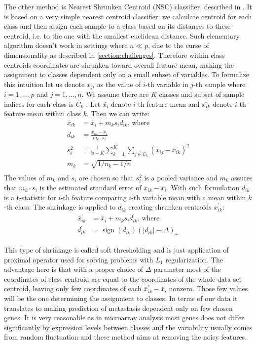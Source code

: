 \documentclass[12pt, wide]{mwart}
\begin{document}
The other method is Nearest Shrunken Centroid (NSC) classifier, described in \cite{NSC}. It is based on a very simple nearest centroid classifier: we calculate centroid for each class and then assign each sample to a class based on its distances to these centroid, i.e. to the one with the smallest euclidean distance. Such elementary algorithm doesn't work in settings where $n \ll p$, due to the curse of dimensionality as described in \ref{section:challenges}. Therefore within class centroids coordinates are shrunken toward overall feature mean, making the assignment to classes dependent only on a small subset of variables. To formalize this intuition let us denote $x_{ji}$ as the value of $i$-th variable in $j$-th sample where $i=1, \ldots, p$ and $j=1,\ldots,n$. We assume there are $K$ classes and subset of sample indices for each class is $C_k$ . Let $\bar{x_i}$ denote $i$-th feature mean and $\bar{x_{ik}}$ denote $i$-th feature mean within class $k$. Then we can write:
\begin{align*}
    \bar{x}_{i k}&=\bar{x}_{i}+m_{k} s_{i} d_{i k} \text{, where} \\
    d_{i k}&=\frac{\bar{x}_{i k}-\bar{x}_{i}}{m_{k} \cdot s_{i}} \\ 
    s_{i}^{2}&=\frac{1}{n-K} \sum_{k=1}^{K} \sum_{j \in C_{k}}\left(x_{i j}-\bar{x}_{i k}\right)^{2} \\
    m_{k}&=\sqrt{1 / n_{k}-1 / n} \\
\end{align*}
The values of $m_k$ and $s_i$ are chosen so that $s_i^2$ is a pooled variance and $m_k$ assures that $m_k \cdot s_i$ is the estimated standard error of $\bar{x}_{i k}-\bar{x}_{i}$. With such formulation $d_{ik}$ is a t-statistic for $i$-th feature comparing $i$-th variable mean with a mean within $k$-th class. The shrinkage is applied to $d_{ik}$ creating shrunken centroids $\bar{x}_{ik}^{\prime}$:
\begin{align*}
    \bar{x}_{i k}^{\prime}&=\bar{x}_{i}+m_{k} s_{i} d_{i k}^{\prime} \text{, where} \\
    d_{i k}^{\prime}&=\operatorname{sign}\left(d_{i k}\right)\left(\left|d_{i k}\right|-\Delta\right)_{+}
\end{align*}

This type of shrinkage is called soft thresholding and is just application of proximal operator used for solving problems with $L_1$ regularization. The advantage here is that with a proper choice of $\Delta$ parameter most of the coordinates of class centroid are equal to the coordinates of the whole data set centroid, leaving only few coordinates of each $\bar{x}_{i k}^{\prime} - \bar{x}_{i}$ nonzero. Those few values will be the one determining the assignment to classes. In terms of our data it translates to making prediction of metastasis dependent only on few chosen genes. It is very reasonable as in microarray analysis most genes does not differ significantly by expression levels between classes and the variability usually comes from random fluctuation and these method aims at removing the noisy features.
\end{document}
